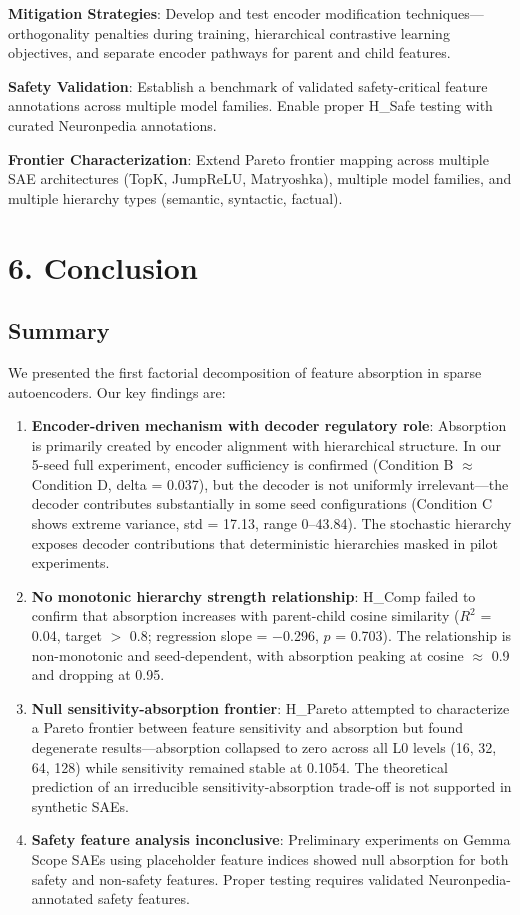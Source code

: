 \documentclass{article}
\begin{document}
\textbf{Mitigation Strategies}: Develop and test encoder modification techniques---orthogonality penalties during training, hierarchical contrastive learning objectives, and separate encoder pathways for parent and child features.

\textbf{Safety Validation}: Establish a benchmark of validated safety-critical feature annotations across multiple model families. Enable proper H\_Safe testing with curated Neuronpedia annotations.

\textbf{Frontier Characterization}: Extend Pareto frontier mapping across multiple SAE architectures (TopK, JumpReLU, Matryoshka), multiple model families, and multiple hierarchy types (semantic, syntactic, factual).

\section{6. Conclusion}

\subsection{Summary}

We presented the first factorial decomposition of feature absorption in sparse autoencoders. Our key findings are:

\begin{enumerate}
\item \textbf{Encoder-driven mechanism with decoder regulatory role}: Absorption is primarily created by encoder alignment with hierarchical structure. In our 5-seed full experiment, encoder sufficiency is confirmed (Condition B $\approx$ Condition D, delta = 0.037), but the decoder is not uniformly irrelevant---the decoder contributes substantially in some seed configurations (Condition C shows extreme variance, std = 17.13, range 0--43.84). The stochastic hierarchy exposes decoder contributions that deterministic hierarchies masked in pilot experiments.

\item \textbf{No monotonic hierarchy strength relationship}: H\_Comp failed to confirm that absorption increases with parent-child cosine similarity ($R^2$ = 0.04, target $>$ 0.8; regression slope = $-$0.296, $p$ = 0.703). The relationship is non-monotonic and seed-dependent, with absorption peaking at cosine $\approx$ 0.9 and dropping at 0.95.

\item \textbf{Null sensitivity-absorption frontier}: H\_Pareto attempted to characterize a Pareto frontier between feature sensitivity and absorption but found degenerate results---absorption collapsed to zero across all L0 levels (16, 32, 64, 128) while sensitivity remained stable at 0.1054. The theoretical prediction of an irreducible sensitivity-absorption trade-off is not supported in synthetic SAEs.

\item \textbf{Safety feature analysis inconclusive}: Preliminary experiments on Gemma Scope SAEs using placeholder feature indices showed null absorption for both safety and non-safety features. Proper testing requires validated Neuronpedia-annotated safety features.
\end{enumerate}
\end{document}
